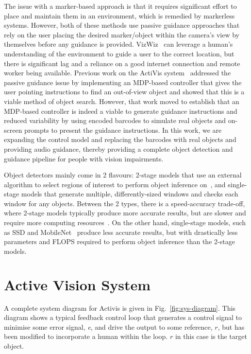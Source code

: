 \documentclass[runningheads]{llncs}
\begin{document}
The issue with a marker-based approach is that it requires significant effort to place and maintain them in an environment, which is remedied by markerless systems.
However, both of these methods use passive guidance approaches that rely on the user placing the desired marker/object within the camera's view by themselves before any guidance is provided. 
VizWiz~\cite{bigham2010vizwiz} can leverage a human's understanding of the environment to guide a user to the correct location, but there is significant lag and a reliance on a good internet connection and remote worker being available. 
Previous work on the ActiVis system~\cite{lock2019active} addressed the passive guidance issue by implementing an MDP-based controller that gives the user pointing instructions to find an out-of-view object and showed that this is a viable method of object search. 
However, that work moved to establish that an MDP-based controller is indeed a viable to generate guidance instructions and reduced variability by using encoded barcodes to simulate real objects and on-screen prompts to present the guidance instructions.
In this work, we are expanding the control model and replacing the barcodes with real objects and providing audio guidance, thereby providing a complete object detection and guidance pipeline for people with vision impairments.  

Object detectors mainly come in 2 flavours: 2-stage models that use an external algorithm to select regions of interest to perform object inference on~\cite{ren2015faster}, and single-stage models that generate multiple, differently-sized windows and checks each window for any objects.
Between the 2 types, there is a speed-accuracy trade-off, where 2-stage models typically produce more accurate results, but are slower and require more computing resources~\cite{liu2018deeplf}.
On the other hand, single-stage models, such as SSD and MobileNet~\cite{liu2016ssd,howard2017mobilenet} produce less accurate results, but with drastically less parameters and FLOPS required to perform object inference than the 2-stage models. 

\section{Active Vision System}\label{sec:active-vision}

A complete system diagram for Activis is given in Fig.~\ref{fig:sys-diagram}. 
This diagram shows a typical feedback control loop that generates a control signal to minimise some error signal, \emph{e}, and drive the output to some reference, $r$, but has been modified to incorporate a human within the loop.
$r$ in this case is the target object. 
\end{document}
